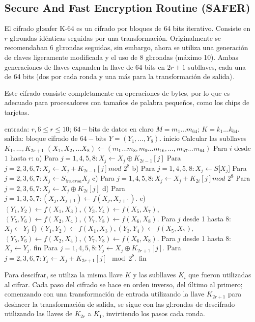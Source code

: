 \subsection{Secure And Fast Encryption Routine (SAFER)}

El cifrado \acrshort{gl:safer} K-64 es un cifrado por bloques de 64 bits
iterativo. Consiste en $r$ \glspl{gl:ronda} idénticas seguidas por una
transformación. Originalmente se recomendaban $6$ \glspl{gl:ronda} seguidas,
sin embargo, ahora se utiliza una generación de claves ligeramente modificada y
el uso de $8$ \glspl{gl:ronda} (máximo 10). Ambas generaciones de llaves
expanden la llave de 64 bits en $2r+1$ subllaves, cada una de 64 bits (dos por
cada ronda y una más para la transformación de salida).

Este cifrado consiste completamente en operaciones de bytes, por lo que
es adecuado para procesadores con tamaños de palabra pequeños, como los
chips de tarjetas.


\begin{pseudocodigo}[caption={SAFER K-64, cifrado.}, label={safer:1}]
  entrada: $r, 6\leq r \leq10$; $64-$bits de datos en claro $M = m_1 \dots m_{64}$; $ K = k_1 \dots k_{64}$.
  salida: bloque cifrado de $64-$bits $Y = (Y_1, \dots, Y_8)$.
  inicio
    Calcular las subllaves $K_1, \dots, K_{2r+1}$
    $(X_1, X_2, \dots X_8) \leftarrow (m_1 \dots m_8, m_9 \dots m_{16}, \dots, m_{57} \dots m_{64})$
    Para $i$ desde $1$ hasta $r$:
      a) Para $j = 1, 4, 5, 8: X_j \leftarrow X_j \oplus K_{2i-1}[j]$
        Para $j = 2, 3, 6, 7: X_j \leftarrow X_j + K_{2i-1}[j]$$mod$ $2^8$
      b) Para $j = 1, 4, 5, 8: X_j \leftarrow S$[$X_j$]
        Para $j = 2, 3, 6, 7: X_j \leftarrow S_{inversa}X_j$
      c) Para $j = 1, 4, 5, 8: X_j \leftarrow X_j + K_{2i}[j]$$mod$ $2^8$
        Para $j = 2, 3, 6, 7: X_j \leftarrow X_j \oplus K_{2i}[j]$
      d) Para $j = 1, 3, 5, 7: (X_j, X_{j+1}) \leftarrow f(X_j, X_{j+1})$.
      e) $(Y_1, Y_2 ) \leftarrow f(X_1, X_3), (Y_3, Y_4 ) \leftarrow f(X_5, X_7)$,
        $(Y_5, Y_6 ) \leftarrow f(X_2, X_4), (Y_7, Y_8 ) \leftarrow f(X_6, X_8 )$.
        Para $j$ desde 1 hasta 8: $X_j \leftarrow Y_j$
      f) $(Y_1, Y_2) \leftarrow f(X_1, X_3), (Y_3, Y_4) \leftarrow f(X_5, X_7)$,
        $(Y_5, Y_6 ) \leftarrow f(X_2, X_4), (Y_7, Y_8) \leftarrow f(X_6, X_8)$.
        Para $j$ desde 1 hasta 8: $X_j \leftarrow Y_j$.
    fin
    Para $j = 1, 4, 5, 8: Y_j \leftarrow X_j \oplus K_{2r+1}[j]$.
      Para $j = 2, 3, 6, 7: Y_j \leftarrow X_j + K_{2r+1} [j] \mod 2^8$.
  fin
\end{pseudocodigo}

Para descifrar, se utiliza la misma llave $K$ y las subllaves $K_i$
que fueron utilizadas al cifrar. Cada paso del cifrado se hace en orden
inverso, del último al primero; comenzando con una transformación de entrada
utilizando la llave $K_{2r+1}$ para deshacer la transformación de salida, se
sigue con las \glspl{gl:ronda} de descifrado utilizando las llaves de $K_{2r}$
a $K_1$, invirtiendo los pasos cada ronda.
